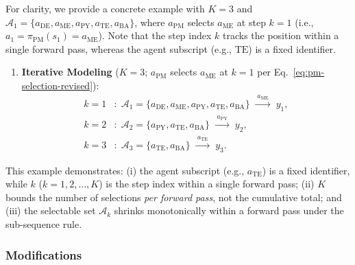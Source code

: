 \documentclass[11pt,a4paper]{article}
\begin{document}
\smallskip
For clarity, we provide a concrete example with $K{=}3$ and $\mathcal{A}_1{=}\{a_{\text{DE}}, a_{\text{ME}}, a_{\text{PY}}, a_{\text{TE}}, a_{\text{BA}}\}$, where $a_{\text{PM}}$ selects $a_{\text{ME}}$ at step $k{=}1$ (i.e., $a_1{=}\pi_{\mathrm{PM}}(s_1){=}a_{\text{ME}}$). Note that the step index $k$ tracks the position within a single forward pass, whereas the agent subscript (e.g., $\text{TE}$) is a fixed identifier.

\medskip
\begin{enumerate}\setlength{\itemsep}{6pt}
\item \textbf{Iterative Modeling}\; ($K{=}3$; $a_{\text{PM}}$ selects $a_{\text{ME}}$ at $k{=}1$ per Eq.~\eqref{eq:pm-selection-revised}):
\[
\begin{aligned}
k{=}1&:\; \mathcal{A}_1{=}\{a_{\text{DE}}, a_{\text{ME}}, a_{\text{PY}}, a_{\text{TE}}, a_{\text{BA}}\}
\;\xrightarrow{\;a_{\text{ME}}\;}\; y_1,\\
k{=}2&:\; \mathcal{A}_2{=}\{a_{\text{PY}}, a_{\text{TE}}, a_{\text{BA}}\}
\;\xrightarrow{\;a_{\text{PY}}\;}\; y_2,\\
k{=}3&:\; \mathcal{A}_3{=}\{a_{\text{TE}}, a_{\text{BA}}\}
\;\xrightarrow{\;a_{\text{TE}}\;}\; y_3.
\end{aligned}
\]
\end{enumerate}


\noindent This example demonstrates: (i) the agent subscript (e.g., $a_{\text{TE}}$) is a fixed identifier, while $k$ ($k=1,2,\ldots,K$) is the step index within a single forward pass; (ii) $K$ bounds the number of selections \textit{per forward pass}, not the cumulative total; and (iii) the selectable set $\mathcal{A}_k$ shrinks monotonically within a forward pass under the sub-sequence rule.

\subsubsection{Modifications}
\end{document}
